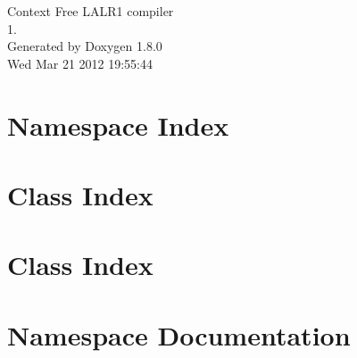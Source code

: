 \documentclass{book}
\begin{document}
\hypersetup{pageanchor=false,citecolor=blue}
\begin{titlepage}
\vspace*{7cm}
\begin{center}
{\Large Context Free L\-A\-L\-R1 compiler \\[1ex]\large 1. }\\
\vspace*{1cm}
{\large Generated by Doxygen 1.8.0}\\
\vspace*{0.5cm}
{\small Wed Mar 21 2012 19:55:44}\\
\end{center}
\end{titlepage}
\clearemptydoublepage
{}
\tableofcontents
\clearemptydoublepage
{}
\hypersetup{pageanchor=true,citecolor=blue}
\chapter{Namespace Index}

\chapter{Class Index}

\chapter{Class Index}

\chapter{Namespace Documentation}




\end{document}
